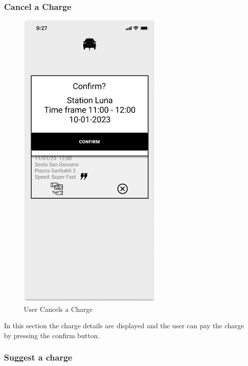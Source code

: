 \subsubsection{Cancel a Charge}
\begin{figure}[H]
    \centering
    \includegraphics[keepaspectratio, height=15cm]{Mockup/UserAppInterface/Delete Charge.png}
    \caption{User Cancels a Charge}
    \label{pop:Delete}
\end{figure}
In this section the charge details are displayed and the user can pay the charge by pressing the confirm button.

\subsubsection{Suggest a charge}

